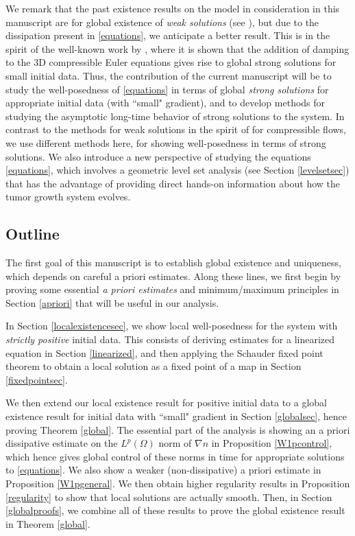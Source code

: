 \documentclass[12pt]{article}
\theoremstyle{plain}
\begin{document}
We remark that the past existence results on the model in consideration in this manuscript are for global existence of \textit{weak solutions} (see \cite{WeberTrivisa}), but due to the dissipation present in \eqref{equations}, we anticipate a better result. This is in the spirit of the well-known work by \cite{Sideris}, where it is shown that the addition of damping to the 3D compressible Euler equations gives rise to global strong solutions for small initial data. Thus, the contribution of the current manuscript will be to study the well-posedness of \eqref{equations} in terms of global \textit{strong solutions} for appropriate initial data (with ``small" gradient), and to develop methods for studying the asymptotic long-time behavior of strong solutions to the system. In contrast to the methods for weak solutions in the spirit of \cite{FeireislCompressible, LionsBook} for compressible flows, we use different methods here, for showing well-posedness in terms of strong solutions. We also introduce a new perspective of studying the equations \eqref{equations}, which involves a geometric level set analysis (see Section \ref{levelsetsec}) that has the advantage of providing direct hands-on information about how the tumor growth system evolves.

\subsection{Outline}

The first goal of this manuscript is to establish global existence and uniqueness, which depends on careful a priori estimates. Along these lines, we first begin by proving some essential \textit{a priori estimates} and minimum/maximum principles in Section \ref{apriori} that will be useful in our analysis. 

In Section \ref{localexistencesec}, we show local well-posedness for the system with \textit{strictly positive} initial data. This consists of deriving estimates for a linearized equation in Section \ref{linearized}, and then applying the Schauder fixed point theorem to obtain a local solution as a fixed point of a map in Section \ref{fixedpointsec}. 

We then extend our local existence result for positive initial data to a global existence result for initial data with ``small" gradient in Section \ref{globalsec}, hence proving Theorem \ref{global}. The essential part of the analysis is showing an a priori dissipative estimate on the $L^{p}(\Omega)$ norm of $\nabla n$ in Proposition \ref{W1pcontrol}, which hence gives global control of these norms in time for appropriate solutions to \eqref{equations}. We also show a weaker (non-dissipative) a priori estimate in Proposition \ref{W1pgeneral}. We then obtain higher regularity results in Proposition \ref{regularity} to show that local solutions are actually smooth. Then, in Section \ref{globalproofs}, we combine all of these results to prove the global existence result in Theorem \ref{global}. 
\end{document}
